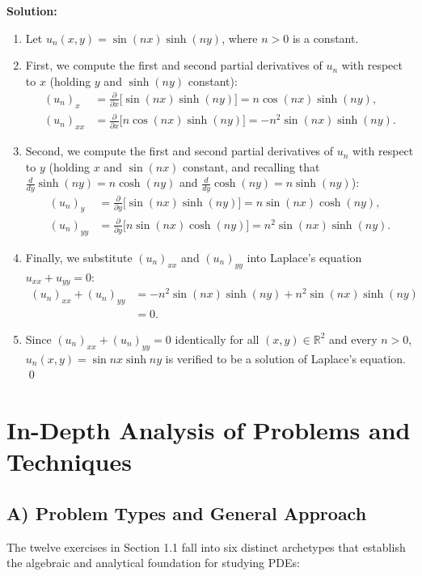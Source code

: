 \documentclass[11pt,a4paper]{article}
\begin{document}
\textbf{Solution:}
\begin{enumerate}
    \item Let $u_n(x, y) = \sin(nx)\sinh(ny)$, where $n > 0$ is a constant.
    \item First, we compute the first and second partial derivatives of $u_n$ with respect to $x$ (holding $y$ and $\sinh(ny)$ constant):
    \begin{align*}
        (u_n)_x &= \frac{\partial}{\partial x}\big[\sin(nx)\sinh(ny)\big] = n\cos(nx)\sinh(ny), \\
        (u_n)_{xx} &= \frac{\partial}{\partial x}\big[n\cos(nx)\sinh(ny)\big] = -n^2\sin(nx)\sinh(ny).
    \end{align*}
    \item Second, we compute the first and second partial derivatives of $u_n$ with respect to $y$ (holding $x$ and $\sin(nx)$ constant, and recalling that $\frac{d}{dy}\sinh(ny) = n\cosh(ny)$ and $\frac{d}{dy}\cosh(ny) = n\sinh(ny)$):
    \begin{align*}
        (u_n)_y &= \frac{\partial}{\partial y}\big[\sin(nx)\sinh(ny)\big] = n\sin(nx)\cosh(ny), \\
        (u_n)_{yy} &= \frac{\partial}{\partial y}\big[n\sin(nx)\cosh(ny)\big] = n^2\sin(nx)\sinh(ny).
    \end{align*}
    \item Finally, we substitute $(u_n)_{xx}$ and $(u_n)_{yy}$ into Laplace's equation $u_{xx} + u_{yy} = 0$:
    \begin{align*}
        (u_n)_{xx} + (u_n)_{yy} &= -n^2\sin(nx)\sinh(ny) + n^2\sin(nx)\sinh(ny) \\
        &= 0.
    \end{align*}
    \item Since $(u_n)_{xx} + (u_n)_{yy} = 0$ identically for all $(x, y) \in \mathbb{R}^2$ and every $n > 0$, $u_n(x, y) = \sin nx \sinh ny$ is verified to be a solution of Laplace's equation. \qed
\end{enumerate}

\newpage
\section{In-Depth Analysis of Problems and Techniques}

\subsection{A) Problem Types and General Approach}
The twelve exercises in Section 1.1 fall into six distinct archetypes that establish the algebraic and analytical foundation for studying PDEs:
\end{document}

